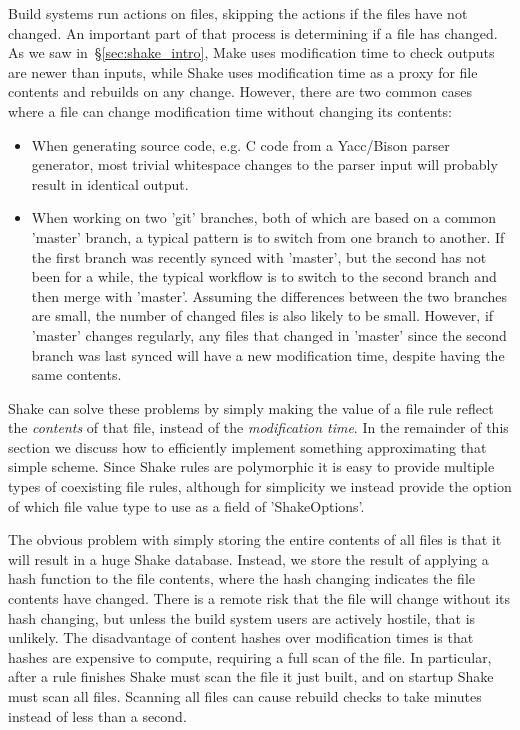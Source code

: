 Build systems run actions on files, skipping the actions if the files have not
changed. An important part of that process is determining if a file has
changed. As we saw in~\S\ref{sec:shake_intro}, Make uses modification time to
check outputs are newer than inputs, while Shake uses modification time as a
proxy for file contents and rebuilds on any change. However, there are two
common cases where a file can change modification time without changing its
contents:

\begin{itemize}
\item When generating source code, e.g. C code from a Yacc/Bison parser generator,
most trivial whitespace changes to the parser input will probably result in
identical output.
\item When working on two \lst'git' branches, both of which are based on a
common \lst'master' branch, a typical pattern is to switch from one branch to
another. If the first branch was recently synced with \lst'master', but the
second has not been for a while, the typical workflow is to switch to the second
branch and then merge with \lst'master'. Assuming the differences between the
two branches are small, the number of changed files is also likely to be small.
However, if \lst'master' changes regularly, any files that changed in
\lst'master' since the second branch was last synced will have a new
modification time, despite having the same contents.
\end{itemize}
\noindent
Shake can solve these problems by simply making the value of a file rule reflect the
\emph{contents} of that file, instead of the \emph{modification time}. In the remainder of
this section we discuss how to efficiently implement something approximating
that simple scheme. Since Shake rules are polymorphic it is easy to provide
multiple types of coexisting file rules, although for simplicity we instead
provide the option of which file value type to use as a field of
\lst'ShakeOptions'.

The obvious problem with simply storing the entire contents of all files is that
it will result in a huge Shake database. Instead, we store the result of
applying a hash function to the file contents, where the hash changing indicates
the file contents have changed. There is a remote risk that the file will
change without its hash changing, but unless the build system users are actively
hostile, that is unlikely. The disadvantage of content hashes over modification
times is that hashes are expensive to compute, requiring a full scan of the
file. In particular, after a rule finishes Shake must scan the file it just
built, and on startup Shake must scan all files. Scanning all files can cause
rebuild checks to take minutes instead of less than a second.

